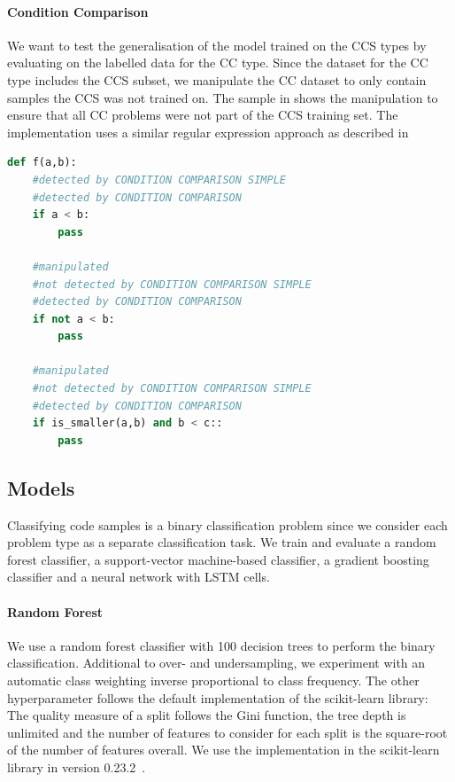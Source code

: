 \paragraph{Condition Comparison}\label{par:manipulation_condition_comparison}
We want to test the generalisation of the model trained on the CCS types by evaluating on the labelled data for the CC type. 
Since the dataset for the CC type includes the CCS subset, we manipulate the CC dataset to only contain samples the CCS was not trained on. The sample in  shows the manipulation to ensure that all CC problems were not part of the CCS training set. The implementation uses a similar regular expression approach as described in 

\begin{lstlisting}[language=Python, label=lst:conidtion_comparison_modified, caption={Sample statements for the differnce between the two analysis plugins CC and CCS.  }]
    def f(a,b):
    #detected by CONDITION COMPARISON SIMPLE
    #detected by CONDITION COMPARISON
    if a < b:
        pass 

    #manipulated
    #not detected by CONDITION COMPARISON SIMPLE
    #detected by CONDITION COMPARISON
    if not a < b:
        pass 

    #manipulated
    #not detected by CONDITION COMPARISON SIMPLE
    #detected by CONDITION COMPARISON
    if is_smaller(a,b) and b < c::
        pass \end{lstlisting}

\subsection{Models}
Classifying code samples is a binary classification problem since we consider each problem type as a separate classification task. We train and evaluate a random forest classifier, a support-vector machine-based classifier, a gradient boosting classifier and a neural network with LSTM cells.

\paragraph{Random Forest}
We use a random forest classifier with 100 decision trees to perform the binary classification. Additional to over- and undersampling, we experiment with an automatic class weighting inverse proportional to class frequency. The other hyperparameter follows the default implementation of the scikit-learn library: The quality measure of a split follows the Gini function, the tree depth is unlimited and the number of features to consider for each split is the square-root of the number of features overall. We use the implementation in the scikit-learn library in version 0.23.2~\cite{scikit-learn}.
